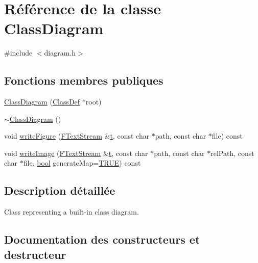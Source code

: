 \hypertarget{class_class_diagram}{}\section{Référence de la classe Class\+Diagram}
\label{class_class_diagram}


{\ttfamily \#include $<$diagram.\+h$>$}

\subsection*{Fonctions membres publiques}
\begin{DoxyCompactItemize}
\item 
\hyperlink{class_class_diagram_abc61e6f209f3e4474a4b4dc7aedaa77d}{Class\+Diagram} (\hyperlink{class_class_def}{Class\+Def} $\ast$root)
\item 
\hyperlink{class_class_diagram_a6ddb806254eae2bc59a5a8c19a51d142}{$\sim$\+Class\+Diagram} ()
\item 
void \hyperlink{class_class_diagram_af2774267335482514626b5f9cad73f1c}{write\+Figure} (\hyperlink{class_f_text_stream}{F\+Text\+Stream} \&\hyperlink{058__bracket__recursion_8tcl_a69e959f6901827e4d8271aeaa5fba0fc}{t}, const char $\ast$path, const char $\ast$file) const 
\item 
void \hyperlink{class_class_diagram_a3cc2aed05da3139bd0bab180a477f42a}{write\+Image} (\hyperlink{class_f_text_stream}{F\+Text\+Stream} \&\hyperlink{058__bracket__recursion_8tcl_a69e959f6901827e4d8271aeaa5fba0fc}{t}, const char $\ast$path, const char $\ast$rel\+Path, const char $\ast$file, \hyperlink{qglobal_8h_a1062901a7428fdd9c7f180f5e01ea056}{bool} generate\+Map=\hyperlink{qglobal_8h_a04a6422a52070f0dc478693da640242b}{T\+R\+U\+E}) const 
\end{DoxyCompactItemize}


\subsection{Description détaillée}
Class representing a built-\/in class diagram. 

\subsection{Documentation des constructeurs et destructeur}
\hypertarget{class_class_diagram_abc61e6f209f3e4474a4b4dc7aedaa77d}{}

